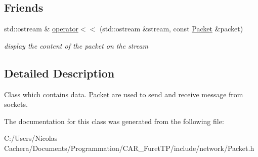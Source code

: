 \subsection*{Friends}
\begin{DoxyCompactItemize}
\item 
\hypertarget{classFTP_1_1Packet_a845b2286ebe97771dfb21b69ee0f2f21}{}std\+::ostream \& \hyperlink{classFTP_1_1Packet_a845b2286ebe97771dfb21b69ee0f2f21}{operator$<$$<$} (std\+::ostream \&stream, const \hyperlink{classFTP_1_1Packet}{Packet} \&packet)\label{classFTP_1_1Packet_a845b2286ebe97771dfb21b69ee0f2f21}

\begin{DoxyCompactList}\small\item\em display the content of the packet on the stream \end{DoxyCompactList}\end{DoxyCompactItemize}


\subsection{Detailed Description}
Class which contains data. \hyperlink{classFTP_1_1Packet}{Packet} are used to send and receive message from sockets. 

The documentation for this class was generated from the following file\+:\begin{DoxyCompactItemize}
\item 
C\+:/\+Users/\+Nicolas Cachera/\+Documents/\+Programmation/\+C\+A\+R\+\_\+\+Furet\+T\+P/include/network/Packet.\+h\end{DoxyCompactItemize}
